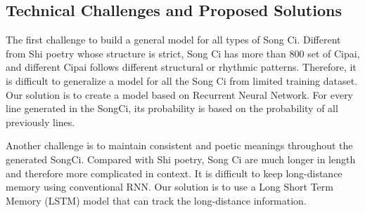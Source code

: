 \subsection{Technical Challenges and Proposed Solutions}
The first challenge to build a general model for all types of Song Ci.
%
Different from Shi poetry whose structure is strict,  Song Ci has more than 800 set of Cipai, and different Cipai follows different structural or rhythmic patterns.
%
Therefore, it is difficult to generalize a model for all the Song Ci from limited training dataset.
% 
Our solution is to create a model based on Recurrent Neural Network. For every line generated in the SongCi, its probability is based on the probability of all previously lines.

Another challenge is to maintain consistent and poetic meanings throughout the generated SongCi.
%
Compared with Shi poetry, Song Ci are much longer in length and therefore more complicated in context.
%
It is difficult to keep long-distance memory using conventional RNN.
% 
Our solution is to use a Long Short Term Memory (LSTM) model that can track the long-distance information. 